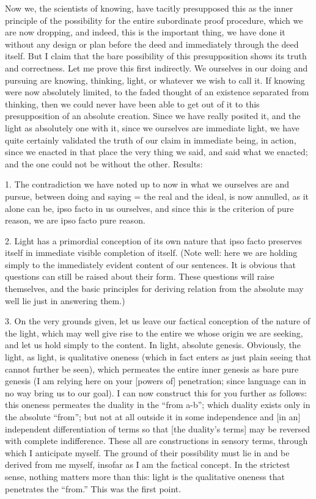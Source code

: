 Now we, the scientists of knowing, have tacitly
presupposed this as the inner principle of
the possibility for the entire subordinate proof procedure,
which we are now dropping,
and indeed, this is the important thing,
we have done it without any design or plan
before the deed and immediately through the deed itself.
But I claim that the bare possibility
of this presupposition shows its truth and correctness.
Let me prove this first indirectly.
We ourselves in our doing and pursuing are knowing,
thinking, light, or whatever we wish to call it.
If knowing were now absolutely limited,
to the faded thought of an existence separated from thinking,
then we could never have been able to get out of it
to this presupposition of an absolute creation.
Since we have really posited it,
and the light as absolutely one with it,
since we ourselves are immediate light,
we have quite certainly validated the truth
of our claim in immediate being, in action,
since we enacted in that place the very thing we said,
and said what we enacted;
and the one could not be without the other.
Results:

1. The contradiction we have noted up to now in
what we ourselves are and pursue,
between doing and saying = the real and the ideal,
is now annulled, as it alone can be,
ipso facto in us ourselves,
and since this is the criterion of pure reason,
we are ipso facto pure reason.

2. Light has a primordial conception of its own nature
that ipso facto preserves itself in immediate
visible completion of itself.
(Note well: here we are holding simply to the
immediately evident content of our sentences.
It is obvious that questions can
still be raised about their form.
These questions will raise themselves,
and the basic principles for deriving relation
from the absolute may well lie just in answering them.)

3. On the very grounds given, let us leave our
factical conception of the nature of the light,
which may well give rise to the entire we
whose origin we are seeking,
and let us hold simply to the content.
In light, absolute genesis.
Obviously, the light, as light, is qualitative oneness
(which in fact enters as just plain seeing
that cannot further be seen),
which permeates the entire
inner genesis as bare pure genesis
(I am relying here on your [powers of] penetration;
since language can in no way bring us to our goal).
I can now construct this for you further as follows:
this oneness permeates the duality in the “from a-b”;
which duality exists only in the absolute “from”;
but not at all outside it in some independence
and [in an] independent differentiation of terms
so that [the duality's terms] may be reversed
with complete indifference.
These all are constructions in sensory terms,
through which I anticipate myself.
The ground of their possibility must lie in
and be derived from me myself,
insofar as I am the factical concept.
In the strictest sense, nothing matters more than this:
light is the qualitative oneness that penetrates the “from.”
This was the first point.

